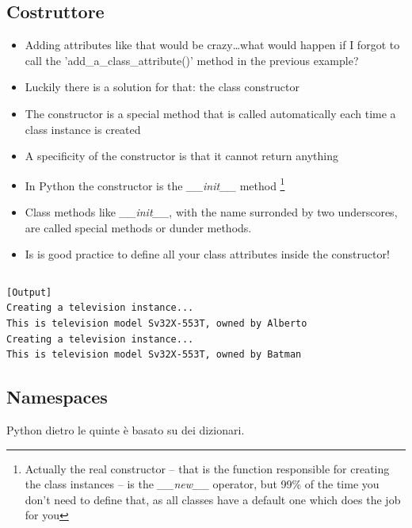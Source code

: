 \subsection{Costruttore}

  \begin{itemize}
    \small
    \item Adding attributes like that would be crazy\dots what would happen if I forgot
          to call the 'add\_a\_class\_attribute()' method in the previous example?
    \medskip
    \item Luckily there is a solution for that: the class \alert{constructor}
    \medskip
    \item The constructor is a special method that is called automatically each time
          a class instance is created
    \medskip
    \item A specificity of the constructor is that it cannot return anything
    \medskip
    \item In Python the constructor is the \emph{\_\_init\_\_} method%
          \footnote{Actually the real constructor -- that is the function responsible for 
                    creating the class instances -- is the \emph{\_\_new\_\_} operator, but 99\% of the time you don't need
                    to define that, as all classes have a default one which does the job for you}           
    \medskip
    \item Class methods like \emph{\_\_init\_\_}, with the name surronded by two underscores,
          are called \alert{special} methods or \alert{dunder} methods.
    \medskip
    \item Is is good practice to define all your class attributes inside the constructor!

  \end{itemize}



\inputminted{python}{snippets/class_constructor.py}

\begin{verbatim}
[Output]
Creating a television instance...
This is television model Sv32X-553T, owned by Alberto
Creating a television instance...
This is television model Sv32X-553T, owned by Batman
\end{verbatim}

\subsection{Namespaces}

Python dietro le quinte  è basato su dei dizionari.\\


